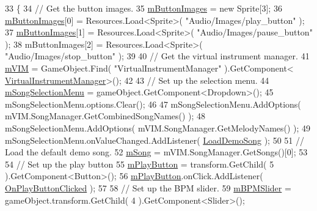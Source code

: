 \begin{DoxyCode}
33     \{
34         \textcolor{comment}{// Get the button images.}
35         \hyperlink{class_a_t_i___diagnostics_demo_song_handler_a26af0da356a95b5be50bb84647674c84}{mButtonImages} = \textcolor{keyword}{new} Sprite[3];
36         \hyperlink{class_a_t_i___diagnostics_demo_song_handler_a26af0da356a95b5be50bb84647674c84}{mButtonImages}[0] = Resources.Load<Sprite>( \textcolor{stringliteral}{"Audio/Images/play\_button"} );
37         \hyperlink{class_a_t_i___diagnostics_demo_song_handler_a26af0da356a95b5be50bb84647674c84}{mButtonImages}[1] = Resources.Load<Sprite>( \textcolor{stringliteral}{"Audio/Images/pause\_button"} );
38         mButtonImages[2] = Resources.Load<Sprite>( \textcolor{stringliteral}{"Audio/Images/stop\_button"} );
39 
40         \textcolor{comment}{// Get the virtual instrument manager.}
41         \hyperlink{class_a_t_i___diagnostics_demo_song_handler_ac3a2216a6de2023d3dd19caa25de7d6f}{mVIM} = GameObject.Find( \textcolor{stringliteral}{"VirtualInstrumentManager"} ).GetComponent<
      \hyperlink{class_virtual_instrument_manager}{VirtualInstrumentManager}>();
42 
43         \textcolor{comment}{// Set up the selection menu.}
44         \hyperlink{class_a_t_i___diagnostics_demo_song_handler_a9c44359a719997d03d3ce26afa5609db}{mSongSelectionMenu} = gameObject.GetComponent<Dropdown>();
45         mSongSelectionMenu.options.Clear();
46 
47         mSongSelectionMenu.AddOptions( mVIM.SongManager.GetCombinedSongNames() );
48         mSongSelectionMenu.AddOptions( mVIM.SongManager.GetMelodyNames() );
49         mSongSelectionMenu.onValueChanged.AddListener( \hyperlink{class_a_t_i___diagnostics_demo_song_handler_aecc26edabf9f923007a18c38a6934a5c}{LoadDemoSong} );
50 
51         \textcolor{comment}{// Load the default demo song.}
52         \hyperlink{class_a_t_i___diagnostics_demo_song_handler_a8d34a075cf131a43db5e81cba4c9ea9d}{mSong} = mVIM.SongManager.GetSongs()[0];
53 
54         \textcolor{comment}{// Set up the play button}
55         \hyperlink{class_a_t_i___diagnostics_demo_song_handler_a364615af222e630eaca110b6d2afdec5}{mPlayButton} = transform.GetChild( 5 ).GetComponent<Button>();
56         \hyperlink{class_a_t_i___diagnostics_demo_song_handler_a364615af222e630eaca110b6d2afdec5}{mPlayButton}.onClick.AddListener( \hyperlink{class_a_t_i___diagnostics_demo_song_handler_acb03659027c98d419fc6ff61dbf24356}{OnPlayButtonClicked} );
57 
58         \textcolor{comment}{// Set up the BPM slider.}
59         \hyperlink{class_a_t_i___diagnostics_demo_song_handler_ad501644f4b61fe763b75e5b63aa5badc}{mBPMSlider} = gameObject.transform.GetChild( 4 ).GetComponent<Slider>();

\end{DoxyCode}
